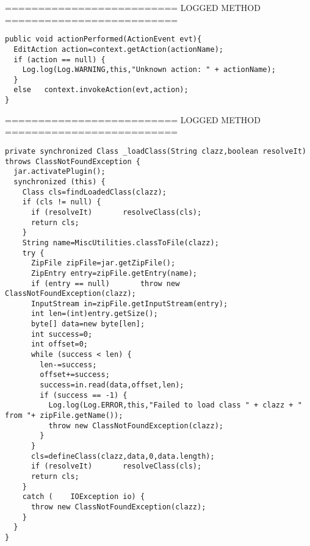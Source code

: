 ========================== LOGGED METHOD ==========================
\begin{lstlisting}
public void actionPerformed(ActionEvent evt){
  EditAction action=context.getAction(actionName);
  if (action == null) {
    Log.log(Log.WARNING,this,"Unknown action: " + actionName);
  }
  else   context.invokeAction(evt,action);
}

\end{lstlisting}
========================== LOGGED METHOD ==========================
\begin{lstlisting}
private synchronized Class _loadClass(String clazz,boolean resolveIt) throws ClassNotFoundException {
  jar.activatePlugin();
  synchronized (this) {
    Class cls=findLoadedClass(clazz);
    if (cls != null) {
      if (resolveIt)       resolveClass(cls);
      return cls;
    }
    String name=MiscUtilities.classToFile(clazz);
    try {
      ZipFile zipFile=jar.getZipFile();
      ZipEntry entry=zipFile.getEntry(name);
      if (entry == null)       throw new ClassNotFoundException(clazz);
      InputStream in=zipFile.getInputStream(entry);
      int len=(int)entry.getSize();
      byte[] data=new byte[len];
      int success=0;
      int offset=0;
      while (success < len) {
        len-=success;
        offset+=success;
        success=in.read(data,offset,len);
        if (success == -1) {
          Log.log(Log.ERROR,this,"Failed to load class " + clazz + " from "+ zipFile.getName());
          throw new ClassNotFoundException(clazz);
        }
      }
      cls=defineClass(clazz,data,0,data.length);
      if (resolveIt)       resolveClass(cls);
      return cls;
    }
    catch (    IOException io) {
      throw new ClassNotFoundException(clazz);
    }
  }
}
\end{lstlisting} 

